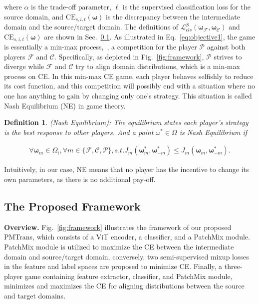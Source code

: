 \documentclass[10pt,twocolumn,letterpaper, ]{article}
\newtheorem{definition}{Definition}
\begin{document}
where $\alpha$ is the trade-off parameter, $\ell$ is the supervised classification loss for the source domain, and $\text{CE}_{s,i,t}(\boldsymbol{\omega})$ is the discrepancy between the intermediate domain and the source/target domain. The definitions of $\mathcal{L}_{cls}^{S}(\boldsymbol{\omega}_{\mathcal{F}}, \boldsymbol{\omega}_{\mathcal{C}})$ and $\text{CE}_{s,i,t}(\boldsymbol{\omega})$ are shown in Sec.~\ref{PMTransframework}. As illustrated in Eq.~\ref{eq:objective1}, the game is essentially a min-max process,~\ie, a competition for the player $\mathcal P$ against both players $\mathcal F$ and $\mathcal C$. Specifically, as depicted in Fig.~\ref{fig:framework}, $\mathcal P$ strives to diverge while $\mathcal{F}$ and $\mathcal C$ try to align domain distributions, which is a min-max process on CE. In this min-max CE game, each player behaves selfishly to reduce its cost function, and this competition will possibly end with a situation where no one has anything to gain by changing only one's strategy. This situation is called Nash Equilibrium (NE) in game theory. 



\begin{definition}
\label{Def:NE}
(Nash Equilibrium): The equilibrium states each player's strategy is the best response to other players. And a point ${\omega}^*\in \Omega$ is Nash Equilibrium if 
\begin{small}
\begin{equation}
    \begin{aligned}
    \forall \boldsymbol{\omega}_{m} \in {\Omega}_{i}, \forall m \in \{\mathcal{F}, \mathcal{C}, \mathcal{P}\}, s.t. J_m(\boldsymbol{\omega}_m^*, \boldsymbol{\omega}_{-m}^*) \leq J_m(\boldsymbol{\omega}_m, \boldsymbol{\omega}_{-m}^*). \nonumber
    \end{aligned}
\end{equation}
\end{small}
\end{definition}
Intuitively, in our case, NE means that no player has the incentive to change its own parameters, as there is no additional pay-off.








\subsection{The Proposed Framework}
\label{PMTransframework}
\noindent \textbf{Overview.}
Fig.~\ref{fig:framework} illustrates the framework of our proposed PMTrans, which consists of a ViT encoder, a classifier, and a PatchMix module. PatchMix module is utilized to maximize the CE between the intermediate domain and source/target domain, conversely, two semi-supervised mixup losses in the feature and label spaces are proposed to minimize CE. Finally, a three-player game containing feature extractor, classifier, and PatchMix module, minimizes and maximizes the CE for aligning distributions between the source and target domains.  
\end{document}
